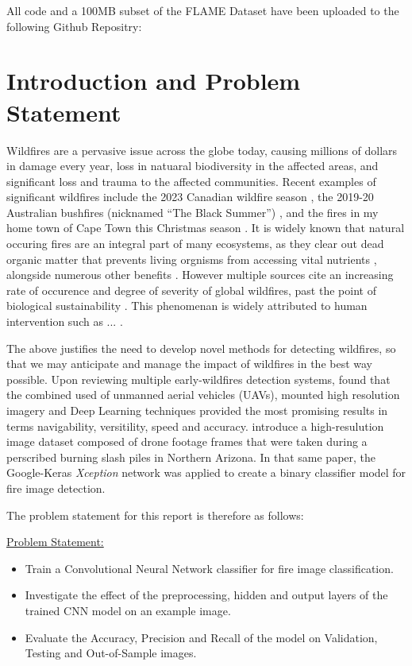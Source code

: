 \documentclass[a4paper,11pt]{article} %
\begin{document}
\medskip

All code and a 100MB subset of the FLAME Dataset have been uploaded to the following Github Repositry: 

\tableofcontents

\section{Introduction and Problem Statement}

Wildfires are a pervasive issue across the globe today, causing millions of dollars in damage every year, loss
in natuaral biodiversity in the affected areas, and significant loss and trauma to the affected communities. Recent examples of significant
wildfires include the 2023 Canadian wildfire season \cite*{Milman_2023}, the 2019-20 Australian bushfires (nicknamed ``The Black Summer'') \cite{Aus_bushfires},
and the fires in my home town of Cape Town this Christmas season \cite{Cape_Fires}. It is widely known that natural occuring fires are an integral
part of many ecosystems, as they clear out dead organic matter that prevents living orgnisms from accessing vital nutrients \cite{fire_benefits}, alongside numerous other benefits \cite{bond2017fires}. 
However multiple sources cite an increasing rate of occurence and degree of severity of global wildfires, past the point of biological sustainability \cite{}. This phenomenan is widely attributed
to human intervention such as ... .

The above justifies the need to develop novel methods for detecting wildfires, so that we may anticipate and manage the impact of wildfires in the best way possible. Upon reviewing multiple early-wildfires detection systems,
 found that the combined used of unmanned aerial vehicles (UAVs), mounted high resolution imagery and Deep Learning techniques provided the most promising
results in terms navigability, versitility, speed and accuracy.  introduce a high-resulution image dataset composed of drone footage frames that were taken during a perscribed burning
slash piles in Northern Arizona. In that same paper, the Google-Keras \emph{Xception} network was applied to create a binary classifier model for fire image detection. 

The problem statement for this report is therefore as follows:

\begin{boxA}
    \underline{Problem Statement:}
\begin{itemize}
    \item Train a Convolutional Neural Network classifier for fire image classification.
    \item Investigate the effect of the preprocessing, hidden and output layers of the trained CNN model on an example image.
    \item Evaluate the Accuracy, Precision and Recall of the model on Validation, Testing and Out-of-Sample images.
\end{itemize}
\end{boxA}
\end{document}
